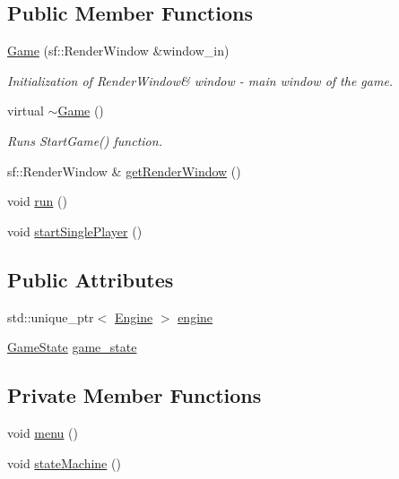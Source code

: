 \subsection*{Public Member Functions}
\begin{DoxyCompactItemize}
\item 
\hyperlink{class_game_a0010695fcd27f6fc91b37b5cf3ed0543}{Game} (sf\+::\+Render\+Window \&window\+\_\+in)
\begin{DoxyCompactList}\small\item\em Initialization of Render\+Window\& window -\/ main window of the game. \end{DoxyCompactList}\item 
virtual \hyperlink{class_game_ae3d112ca6e0e55150d2fdbc704474530}{$\sim$\+Game} ()
\begin{DoxyCompactList}\small\item\em Runs Start\+Game() function. \end{DoxyCompactList}\item 
sf\+::\+Render\+Window \& \hyperlink{class_game_ada9faa2a1f4e1453420adead02fd9865}{get\+Render\+Window} ()
\item 
void \hyperlink{class_game_a1ab78f5ed0d5ea879157357cf2fb2afa}{run} ()
\item 
void \hyperlink{class_game_afbc524f7661c9ce1bea6ca45fd212093}{start\+Single\+Player} ()
\end{DoxyCompactItemize}
\subsection*{Public Attributes}
\begin{DoxyCompactItemize}
\item 
std\+::unique\+\_\+ptr$<$ \hyperlink{class_engine}{Engine} $>$ \hyperlink{class_game_aee6b9ebe224001f736e1ed71a3b28223}{engine}
\item 
\hyperlink{class_game_state}{Game\+State} \hyperlink{class_game_a12c5a68cb0b0f1ca4bd238824253db7c}{game\+\_\+state}
\end{DoxyCompactItemize}
\subsection*{Private Member Functions}
\begin{DoxyCompactItemize}
\item 
void \hyperlink{class_game_a463932fa7ca2f1ce243279bf2422fc48}{menu} ()
\item 
void \hyperlink{class_game_a8bc94200bfbf0421b83b7c2b2b45da72}{state\+Machine} ()
\end{DoxyCompactItemize}

